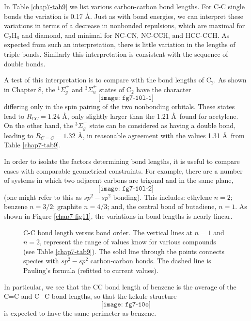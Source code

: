 In Table \ref{chap7-tab9} we list various carbon-carbon bond lengths.
For C-C single bonds the variation is 0.17 \AA.  Just as with bond
energies, we can interpret these variations in terms of a decrease in
nonbonded repulsions, which are maximal for C$_2$H$_6$ and diamond,
and minimal for NC-CN, NC-CCH, and HCC-CCH.  As expected from such an
interpretation, there is little variation in the lengths of triple
bonds.  Similarly this interpretation is consistent with the sequence
of double bonds.

A test of this interpretation is to compare with the bond lengths of 
C$_2$.  As shown in Chapter 8, the ${^1\Sigma}^+_g$ and 
${^3\Sigma}^+_u$ states of C$_2$ have the character
\begin{equation}
\texttt{[image: fg7-10l-1]}
\end{equation}
differing only in the spin pairing of the two nonbonding orbitals.  These 
states lead to $R_{CC} = 1.24$ \AA, only slightly larger than the 1.21 
\AA\ found for acetylene.  On the other hand, the ${^3\Sigma}^-_g$ state 
can be considered as having a double bond, leading to $R_{C=C} = 
1.32$ \AA, in reasonable 
agreement with the values 1.31 \AA\ from Table \ref{chap7-tab9}.

In order to isolate the factors determining bond lengths, it is useful 
to compare cases with comparable geometrical constraints.  For example, 
there are a number of systems in which two adjacent carbons are 
trigonal and in the same plane,
\begin{equation}
\texttt{[image: fg7-10l-2]}
\end{equation}
(one might refer to this as $sp^2 - sp^2$ bonding).  This includes:
ethylene $n = 2$; benzene $n = 3/2$; graphite $n = 4/3$; and, the
central bond of butadiene, $n = 1$.  As shown in Figure
\ref{chap7-fig11}, the variations in bond lengths is nearly linear.
\begin{figure}
\caption{C-C bond length versus bond order.  The vertical lines at $n
= 1$ and $n = 2$, represent the range of values know for various
compounds (see Table \ref{chap7-tab9}).  The solid line through the
points connects species with $sp^2 - sp^2$ carbon-carbon bonds. The
dashed line is Pauling's formula (refitted to current values).}
\label{chap7-fig}
\end{figure}

In particular, we see that the CC bond length of benzene is 
the average of the C=C and C$-$C bond lengths, so that the kekule structure
\begin{equation}
\texttt{[image: fg7-10o]}
\end{equation}
is expected to have the same perimeter as benzene.

